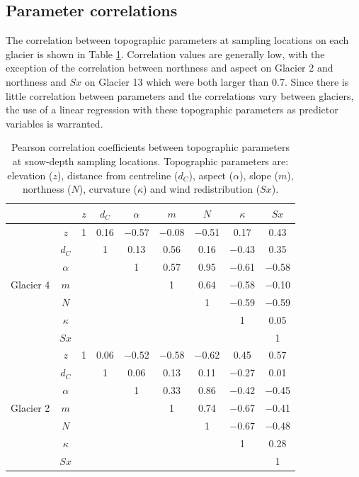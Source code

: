 \documentclass{sfuthesis}
\newcommand{\params}{Topographic parameters are: elevation ($z$), distance from centreline ($d_C$), aspect ($\alpha$), slope ($m$), northness ($N$), curvature ($\kappa$) and wind redistribution ($Sx$). }
\begin{document}
\subsection{Parameter correlations}

The correlation between topographic parameters at sampling locations on each glacier is shown in Table \ref{tab:pearson_correlation}. Correlation values are generally low, with the exception of the correlation between northness and aspect on Glacier 2 and northness and $Sx$ on Glacier 13 which were both larger than 0.7. Since there is little correlation between parameters and the correlations vary between glaciers, the use of a linear regression with these topographic parameters as predictor variables is warranted. 

\begin{table}[H]
\centering
\caption[Pearson correlation coefficients between topographic parameters at snow-depth sampling locations]{Pearson correlation coefficients between topographic parameters at snow-depth sampling locations. \params}
\label{tab:pearson_correlation}
\begin{tabular}{cc|ccccccc}
 &  & $z$ & $d_C$ & $\alpha$ & $m$ & $N$ & $\kappa$ & $Sx$ \\ \hline
\multirow{7}{*}{Glacier 4} & $z$ & 1 & 0.16 & $-$0.57 & $-$0.08 & $-$0.51 & 0.17 & 0.43 \\
 & $d_C$ &  & 1 & 0.13 & 0.56 & 0.16 & $-$0.43 & 0.35 \\
 & $\alpha$ &   &  & 1 & 0.57 & 0.95 & $-$0.61 & $-$0.58 \\
 & $m$ &   &   &   & 1 & 0.64 & $-$0.58 & $-$0.10 \\
 & $N$ &   &   &   &   & 1 & $-$0.59 & $-$0.59 \\
 & $\kappa$ &   &   &   &   &   & 1 & 0.05 \\
 & $Sx$ &   &   &   &   &   &   & 1 \\ \hline
\multirow{7}{*}{Glacier 2} & $z$ & 1 & 0.06 & $-$0.52 & $-$0.58 & $-$0.62 & 0.45 & 0.57 \\
 & $d_C$ &   & 1 & 0.06 & 0.13 & 0.11 & $-$0.27 & 0.01 \\
 & $\alpha$ &   &  & 1 & 0.33 & 0.86 & $-$0.42 & $-$0.45 \\
 & $m$ &   &   &   & 1 & 0.74 & $-$0.67 & $-$0.41 \\
 & $N$ &   &   &   &   & 1 & $-$0.67 & $-$0.48 \\
 & $\kappa$ & &   &   &   &   & 1 & 0.28 \\
 & $Sx$ &   &   &   &   &   &   & 1 \\ \hline

\end{tabular}
\end{table}
\end{document}
